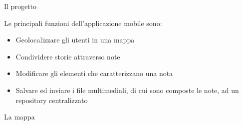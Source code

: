 \documentclass[11pt,aspectratio=169]{beamer}
\begin{document}
\begin{frame}{Il progetto}

Le principali funzioni dell'applicazione mobile sono:
\begin{itemize}
    \item Geolocalizzare gli utenti in una mappa 
    \item Condividere storie attraverso note
    \item Modificare gli elementi che caratterizzano una nota
    \item Salvare ed inviare i file multimediali, di cui sono composte le note, ad un repository centralizzato
\end{itemize}
    
\end{frame}


\begin{frame}{La mappa}


\end{frame}
\end{document}
